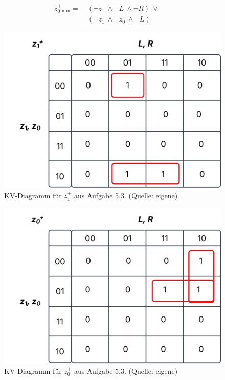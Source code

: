 \begin{equation}\label{eq:z0_min}
\begin{alignat}{3}
    z_0^+_{\text{min}} =\ &(\neg z_1 \ \land \phantom{\neg} L \ \land \neg R)\ \lor &&  \\
    &(\neg z_1 \ \land \phantom{\neg} z_0 \ \land \phantom{\neg} L)
\end{alignat}
\end{equation}

\begin{figure}
    \centering
    \includegraphics[scale=0.5]{aufgabe 5/img/kv_z1.svg}
    \caption{KV-Diagramm für $z_1^+$ aus Aufgabe 5.3.  (Quelle: eigene)}
    \label{fig:kv_z1}
\end{figure}

\begin{figure}
    \centering
    \includegraphics[scale=0.5]{aufgabe 5/img/kv_z0.svg}
    \caption{KV-Diagramm für $z_0^+$ aus Aufgabe 5.3.  (Quelle: eigene)}
    \label{fig:kv_z0}
\end{figure}

